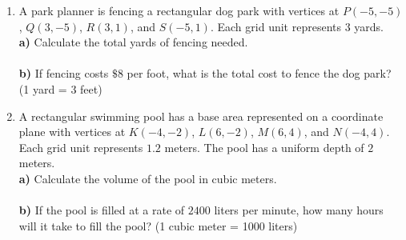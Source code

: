\documentclass[12pt, letterpaper, fleqn]{article}
\newcommand{\blanklong}{\underline{\hspace{6.5cm}}}
\begin{document}
\begin{enumerate}[itemsep=2.5cm, leftmargin=0.6cm]
\item A park planner is fencing a rectangular dog park with vertices at $P(-5, -5)$, $Q(3, -5)$, $R(3, 1)$, and $S(-5, 1)$. Each grid unit represents $3$ yards. \\
\textbf{a)} Calculate the total yards of fencing needed. \\
\blanklong \\
\textbf{b)} If fencing costs $\$8$ per foot, what is the total cost to fence the dog park? (1 yard = 3 feet) \\
\blanklong

\item A rectangular swimming pool has a base area represented on a coordinate plane with vertices at $K(-4, -2)$, $L(6, -2)$, $M(6, 4)$, and $N(-4, 4)$. Each grid unit represents $1.2$ meters. The pool has a uniform depth of $2$ meters. \\
\textbf{a)} Calculate the volume of the pool in cubic meters. \\
\blanklong \\
\textbf{b)} If the pool is filled at a rate of $2400$ liters per minute, how many hours will it take to fill the pool? (1 cubic meter = 1000 liters) \\
\blanklong
\end{enumerate}
\end{document}
